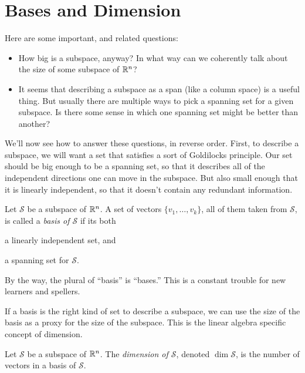 \documentclass[elementsmain.tex]{subfiles}
\begin{document}
\section{Bases and Dimension}

Here are some important, and related questions:
\begin{itemize}
\item How big is a subspace, anyway? In what way can we coherently talk about the size of some subspace of $\mathbb{R}^n$? 
\item It seems that describing a subspace as a span (like a column space) is a useful thing. But usually there are multiple ways to pick a spanning set for a given subspace. Is there some sense in which one spanning set might be better than another?
\end{itemize}

We'll now see how to answer these questions, in reverse order. First, to describe a subspace, we will want a set that satisfies a sort of Goldilocks principle. Our set should be big enough to be a spanning set, so that it describes all of the independent directions one can move in the subspace. But also small enough that it is linearly independent, so that it doesn't contain any redundant information.


\begin{definition}[Basis]
Let $\mathcal{S}$ be a subspace of $\mathbb{R}^n$. A set of vectors $\{v_1, \dots, v_k\}$, all of them taken from $\mathcal{S}$, is called a \emph{basis of $\mathcal{S}$} if its both
\begin{compactitem}
\item a linearly independent set, and
\item a spanning set for $\mathcal{S}$.
\end{compactitem}
\end{definition}

By the way, the plural of ``basis'' is ``bases.'' This is a constant trouble for new learners and spellers.

If a basis is the right kind of set to describe a subspace, we can use the size of the basis as a proxy for the size of the subspace. This is the linear algebra specific concept of dimension.

\begin{definition}[Dimension]
Let $\mathcal{S}$ be a subspace of $\mathbb{R}^n$. The \emph{dimension of $\mathcal{S}$}, denoted
$\dim{\mathcal{S}}$, is the number of vectors in a basis of $\mathcal{S}$.
\end{definition}
\end{document}
